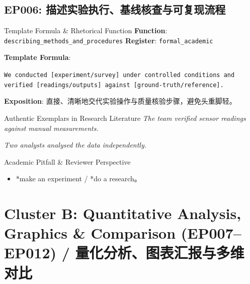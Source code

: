 \subsection{EP006: 描述实验执行、基线核查与可复现流程}\label{sec:ep:EP006}
\begin{ConceptBox}{Template Formula \& Rhetorical Function}
\textbf{Function}: \texttt{describing\_methods\_and\_procedures} \quad \textbf{Register}: \texttt{formal\_academic}\par\vspace{3pt}
\textbf{Template Formula}:\par\noindent\texttt{We conducted [experiment/survey] under controlled conditions and verified [readings/outputs] against [ground-truth/reference].}\par\vspace{4pt}
\textbf{Exposition}: 直接、清晰地交代实验操作与质量核验步骤，避免头重脚轻。
\end{ConceptBox}
\begin{ExampleBox}{Authentic Exemplars in Research Literature}
\textit{The team verified sensor readings against manual measurements.}\par\vspace{2pt}
\textit{Two analysts analysed the data independently.}\par\vspace{2pt}
\end{ExampleBox}
\begin{TipBox}{Academic Pitfall \& Reviewer Perspective}
\begin{itemize}[leftmargin=1.5em, itemsep=1pt]
  \item *make an experiment / *do a research。
\end{itemize}
\end{TipBox}
\vspace{6pt}
\section{Cluster B: Quantitative Analysis, Graphics \& Comparison (EP007--EP012) / 量化分析、图表汇报与多维对比}
